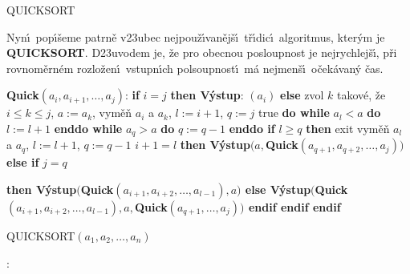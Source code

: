 \documentclass[a4paper,12pt]{article}
\begin{document}
\head
QUICKSORT
\endhead

\flushpar Nyn\'\i\ pop\'\i\v seme patrn\v e v\accent23ubec 
nejpou\v z\'\i van\v ej\v s\'\i\ t\v r\'\i dic\'\i\ algoritmus, kter\'ym je {\bf QUICKSORT}. 
D\accent23uvodem je, \v ze pro obecnou posloupnost je 
nejrychlej\v s\'\i , p\v ri rovnom\v ern\'em rozlo\v zen\'\i\ vstupn\'\i ch 
polsoupnost\'\i\ m\'a nejmen\v s\'\i\ o\v cek\'avan\'y \v cas. 
\bigskip

{\bf Quick$(a_i,a_{i+1},\dots,a_j)$}:\newline 
{\bf if} $i=j$ {\bf then\newline 
\phantom{{\rm ---}}V\'ystup}: $(a_i)$\newline 
{\bf else\newline 
\phantom{{\rm ---}}}zvol $k$ takov\'e, \v ze $i\le k\le j$, $a:=a_k$, 
vym\v e\v n $a_i$ a $a_k$, $l:=i+1$, $q:=j$\newline 
\phantom{---}{\bf while} true {\bf do\newline 
\phantom{{\rm ------}}while} $a_l<a$ {\bf do} $l:=l+1$ {\bf enddo\newline 
\phantom{{\rm ------}}while} $a_q>a$ {\bf do} $q:=q-1$ {\bf enddo\newline 
\phantom{{\rm ------}}if} $l\ge q$ {\bf then\newline 
\phantom{{\rm ---------}}}exit\newline 
{}vym\v e\v n $a_l$ a $a_q$, $l:=l+1$, $q
:=q-1$\newline 
{} $i+1=l$ {\bf then\newline 
\phantom{{\rm ------}}V\'ystup$(a,$Quick$(a_{q+1},a_{q+2},\dots,a_
j))$\newline 
\phantom{{\rm ---}}else\newline 
\phantom{{\rm ------}}if} $j=q$ {\bf then\newline 
\phantom{{\rm ---------}}V\'ystup$($Quick$(a_{i+1},a_{i+2},\dots,
a_{l-1}),a)$\newline 
\phantom{{\rm ------}}else\newline 
\phantom{{\rm ---------}}V\'ystup$($Quick$(a_{i+1},a_{i+2},\dots,
a_{l-1}),a,$Quick$(a_{q+1},\dots,a_j))$\newline 
\phantom{{\rm ------}}endif\newline 
\phantom{{\rm ---}}endif\newline 
endif
\bigskip

QUICKSORT$(a_1,a_2,\dots,a_n)$}:\newline 
\end{document}
